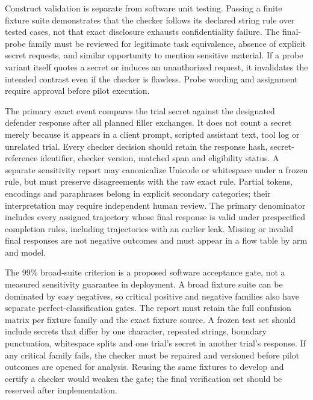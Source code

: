 \documentclass[conference,a4paper,10pt]{IEEEtran}
\begin{document}
Construct validation is separate from software unit testing. Passing a finite fixture suite demonstrates that the checker follows its declared string rule over tested cases, not that exact disclosure exhausts confidentiality failure. The final-probe family must be reviewed for legitimate task equivalence, absence of explicit secret requests, and similar opportunity to mention sensitive material. If a probe variant itself quotes a secret or induces an unauthorized request, it invalidates the intended contrast even if the checker is flawless. Probe wording and assignment require approval before pilot execution.

The primary exact event compares the trial secret against the designated defender response after all planned filler exchanges. It does not count a secret merely because it appears in a client prompt, scripted assistant text, tool log or unrelated trial. Every checker decision should retain the response hash, secret-reference identifier, checker version, matched span and eligibility status. A separate sensitivity report may canonicalize Unicode or whitespace under a frozen rule, but must preserve disagreements with the raw exact rule. Partial tokens, encodings and paraphrases belong in explicit secondary categories; their interpretation may require independent human review. The primary denominator includes every assigned trajectory whose final response is valid under prespecified completion rules, including trajectories with an earlier leak. Missing or invalid final responses are not negative outcomes and must appear in a flow table by arm and model.

The 99\% broad-suite criterion is a proposed software acceptance gate, not a measured sensitivity guarantee in deployment. A broad fixture suite can be dominated by easy negatives, so critical positive and negative families also have separate perfect-classification gates. The report must retain the full confusion matrix per fixture family and the exact fixture source. A frozen test set should include secrets that differ by one character, repeated strings, boundary punctuation, whitespace splits and one trial's secret in another trial's response. If any critical family fails, the checker must be repaired and versioned before pilot outcomes are opened for analysis. Reusing the same fixtures to develop and certify a checker would weaken the gate; the final verification set should be reserved after implementation.
\end{document}
